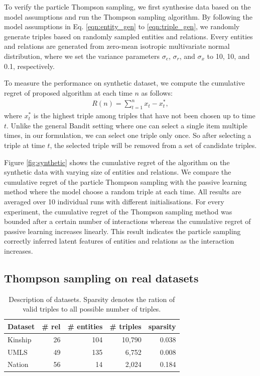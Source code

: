 To verify the particle Thompson sampling, we first synthesise data based on the model assumptions and run 
the Thompson sampling algorithm. By following the model assumptions in Eq. \ref{eqn:entity_gen} to 
\ref{eqn:triple_gen}, we randomly generate triples based on randomly sampled entities and relations. Every 
entities and relations are generated from zero-mean isotropic multivariate normal distribution, where we set 
the variance parameters $\sigma_e$, $\sigma_r$, and $\sigma_x$ to 10, 10, and 0.1, respectively.

To measure the performance on synthetic dataset, we compute the cumulative regret of proposed algorithm at 
each time $n$ as follows:
\begin{align}
R(n) = \sum_{t=1}^{n} x_t - x^{*}_t,
\end{align}
where $x^*_t$ is the highest triple among triples that have not been chosen up to time $t$. Unlike the general 
Bandit setting where one can select a single item multiple times, in our formulation, we can select one triple 
only once. So after selecting a triple at time $t$, the selected triple will be removed from a set of candidate 
triples.

Figure \ref{fig:synthetic} shows the cumulative regret of the algorithm on the synthetic data with varying size of 
entities and relations. We compare the cumulative regret of the particle Thompson sampling with the passive 
learning method where the model choose a random triple at each time. All results are averaged over 10 
individual runs with different initialisations. For every experiment, the cumulative regret of the Thompson 
sampling method was bounded after a certain number of interactions whereas the cumulative regret of 
passive learning increases linearly. This result indicates the particle sampling correctly inferred latent features 
of entities and relations as the interaction increases.

\subsection{Thompson sampling on real datasets}
\begin{table}[t]
\centering
\caption{\label{tbl:dataset}Description of datasets. Sparsity denotes the ration of valid triples to all possible 
number of triples.}
\begin{tabular}{l | r | r | r | r}
Dataset &  \# rel & \# entities & \# triples & sparsity \\ \hline
Kinship & 26 & 104  & 10,790 & 0.038 \\
UMLS & 49 &135  & 6,752 & 0.008 \\
Nation & 56 & 14  & 2,024 & 0.184 \\
\end{tabular}
\end{table}

